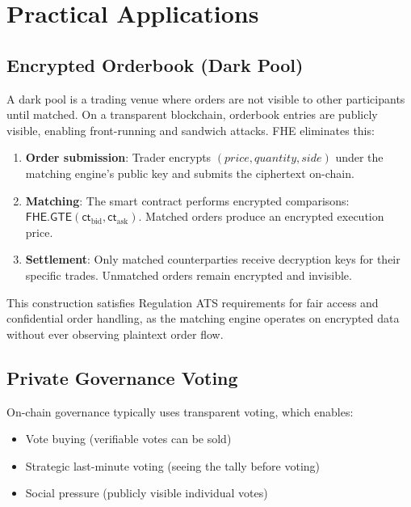 \section{Practical Applications}

\label{sec:applications}

\subsection{Encrypted Orderbook (Dark Pool)}

A dark pool is a trading venue where orders are not visible to other participants
until matched. On a transparent blockchain, orderbook entries are publicly visible,
enabling front-running and sandwich attacks. FHE eliminates this:

\begin{enumerate}[leftmargin=2em]
  \item \textbf{Order submission}: Trader encrypts $(price, quantity, side)$ under
        the matching engine's public key and submits the ciphertext on-chain.
  \item \textbf{Matching}: The smart contract performs encrypted comparisons:
        $\textsf{FHE.GTE}(\textsf{ct}_{\text{bid}}, \textsf{ct}_{\text{ask}})$.
        Matched orders produce an encrypted execution price.
  \item \textbf{Settlement}: Only matched counterparties receive decryption keys
        for their specific trades. Unmatched orders remain encrypted and invisible.
\end{enumerate}

This construction satisfies Regulation ATS requirements for fair access and
confidential order handling, as the matching engine operates on encrypted data
without ever observing plaintext order flow.

\subsection{Private Governance Voting}

On-chain governance typically uses transparent voting, which enables:
\begin{itemize}[leftmargin=2em]
  \item Vote buying (verifiable votes can be sold)
  \item Strategic last-minute voting (seeing the tally before voting)
  \item Social pressure (publicly visible individual votes)
\end{itemize}

